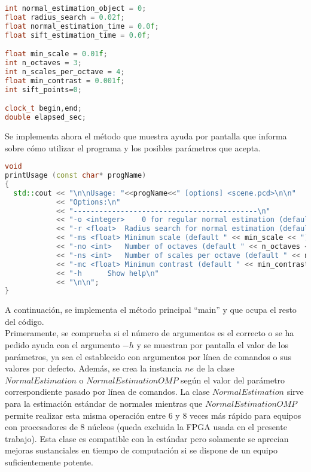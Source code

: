 \begin{lstlisting}[language=C++,breaklines]
int normal_estimation_object = 0;
float radius_search = 0.02f;
float normal_estimation_time = 0.0f;
float sift_estimation_time = 0.0f;

float min_scale = 0.01f;
int n_octaves = 3;
int n_scales_per_octave = 4;
float min_contrast = 0.001f;
int sift_points=0; 

clock_t begin,end;
double elapsed_sec;
\end{lstlisting}


Se implementa ahora el método que muestra ayuda por pantalla que informa sobre cómo utilizar el programa y los posibles parámetros que acepta.

\begin{lstlisting}[language=C++,breaklines]
void 
printUsage (const char* progName)
{
  std::cout << "\n\nUsage: "<<progName<<" [options] <scene.pcd>\n\n"
            << "Options:\n"
            << "-------------------------------------------\n"
            << "-o <integer>	0 for regular normal estimation (default), 1 for enhanced normal estimation\n"
            << "-r <float>	Radius search for normal estimation (default "<< radius_search<<")\n"
            << "-ms <float>	Minimum scale (default " << min_scale << ")\n"
            << "-no <int>	Number of octaves (default " << n_octaves << ")\n"
            << "-ns <int>	Number of scales per octave (default " << n_scales_per_octave << ")\n"
	    	<< "-mc <float>	Minimum contrast (default " << min_contrast << ")\n"
	    	<< "-h		Show help\n"
            << "\n\n";
}
\end{lstlisting}


A continuación, se implementa el método principal ``main'' y que ocupa el resto del código.\\
Primeramente, se comprueba si el número de argumentos es el correcto o se ha pedido ayuda con el argumento $-h$ y se muestran por pantalla el valor de los parámetros, ya sea el establecido con argumentos por línea de comandos o sus valores por defecto.
Además, se crea la instancia $ne$ de la clase $NormalEstimation$ o $NormalEstimationOMP$ según el valor del parámetro correspondiente pasado por línea de comandos. La clase $NormalEstimation$ sirve para la estimación estándar de normales mientras que $NormalEstimationOMP$ permite realizar esta misma operación entre 6 y 8 veces más rápido para equipos con procesadores de 8 núcleos (queda excluida la FPGA usada en el presente trabajo). Esta clase es compatible con la estándar pero solamente se aprecian mejoras sustanciales en tiempo de computación si se dispone de un equipo suficientemente potente.

